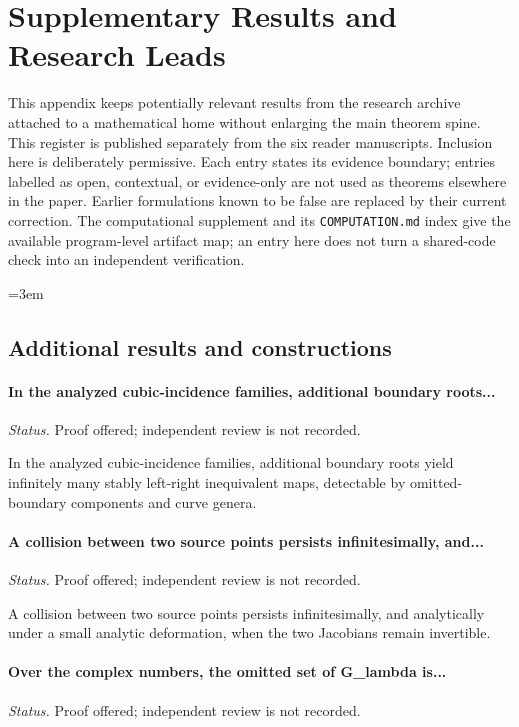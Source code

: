 \section{Supplementary Results and Research Leads}
\label{app:supplementary-register-04}

This appendix keeps potentially relevant results from the research
archive attached to a mathematical home without enlarging the main
theorem spine.  This register is published separately from the six reader manuscripts.  Inclusion here is deliberately permissive.  Each entry
states its evidence boundary; entries labelled as open, contextual, or
evidence-only are not used as theorems elsewhere in the paper.  Earlier
formulations known to be false are replaced by their current correction.
The computational supplement and its \texttt{COMPUTATION.md} index give
the available program-level artifact map; an entry here does not turn a
shared-code check into an independent verification.
\begingroup\raggedright\emergencystretch=3em

\subsection{Additional results and constructions}

\label{supp-note-04-001}
\paragraph{In the analyzed cubic-incidence families, additional boundary roots...}
\emph{Status.} Proof offered; independent review is not recorded.

In the analyzed cubic-incidence families, additional boundary roots yield infinitely many stably left-right inequivalent maps, detectable by omitted-boundary components and curve genera.

\label{supp-note-04-002}
\paragraph{A collision between two source points persists infinitesimally, and...}
\emph{Status.} Proof offered; independent review is not recorded.

A collision between two source points persists infinitesimally, and analytically under a small analytic deformation, when the two Jacobians remain invertible.

\label{supp-note-04-003}
\paragraph{Over the complex numbers, the omitted set of G\_lambda is...}
\emph{Status.} Proof offered; independent review is not recorded.

